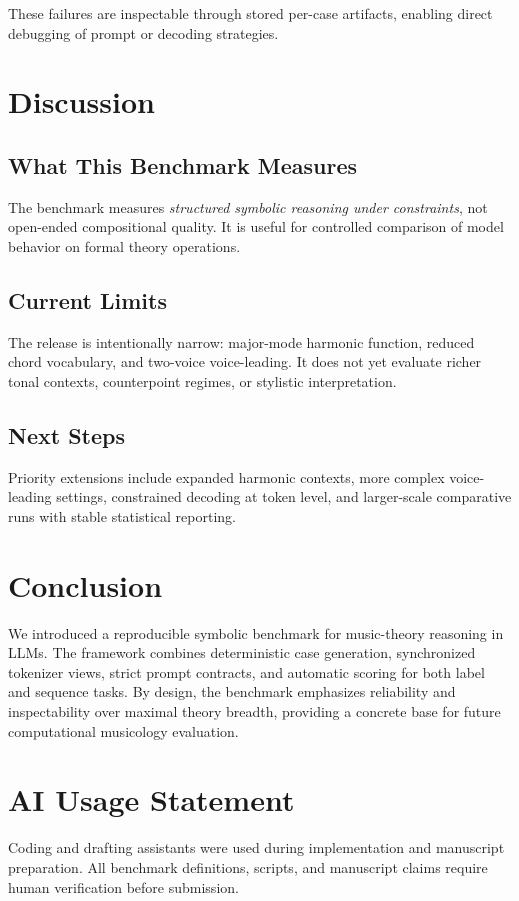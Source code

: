 \documentclass{article}
\begin{document}
These failures are inspectable through stored per-case artifacts, enabling direct debugging of prompt or decoding strategies.

\section{Discussion}
\label{sec:discussion}

\subsection{What This Benchmark Measures}

The benchmark measures \emph{structured symbolic reasoning under constraints}, not open-ended compositional quality. It is useful for controlled comparison of model behavior on formal theory operations.

\subsection{Current Limits}

The release is intentionally narrow: major-mode harmonic function, reduced chord vocabulary, and two-voice voice-leading. It does not yet evaluate richer tonal contexts, counterpoint regimes, or stylistic interpretation.

\subsection{Next Steps}

Priority extensions include expanded harmonic contexts, more complex voice-leading settings, constrained decoding at token level, and larger-scale comparative runs with stable statistical reporting.

\section{Conclusion}
\label{sec:conclusion}

We introduced a reproducible symbolic benchmark for music-theory reasoning in LLMs. The framework combines deterministic case generation, synchronized tokenizer views, strict prompt contracts, and automatic scoring for both label and sequence tasks. By design, the benchmark emphasizes reliability and inspectability over maximal theory breadth, providing a concrete base for future computational musicology evaluation.

\section{AI Usage Statement}
\label{sec:ai}

Coding and drafting assistants were used during implementation and manuscript preparation. All benchmark definitions, scripts, and manuscript claims require human verification before submission.



\end{document}
